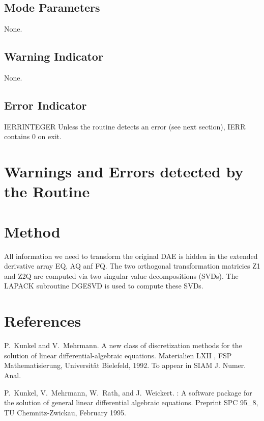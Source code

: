 \subsection{Mode Parameters}
None.

\subsection{Warning Indicator}
None.

\subsection{Error Indicator}

\begin{entry}{IERR}{INTEGER}
  Unless the routine detects an error (see next section), IERR
  contains $0$ on exit.
\end{entry}

\section{Warnings and Errors detected by the Routine}


\section{Method}

All information we need to transform the original DAE is hidden in the
extended derivative array EQ, AQ anf FQ. The two orthogonal transformation
matricies Z1 and Z2Q are computed via two singular value
decompositions (SVDs). The LAPACK subroutine DGESVD is used to compute
these SVDs. 

\section{References}

\begin{thebibliography}{1}
P.~Kunkel and V.~Mehrmann.
\newblock A new class of discretization methods for the solution of linear
  differential-algebraic equations.
\newblock Materialien LXII , FSP Mathematisierung, Universit{\"a}t Bielefeld,
  1992.
\newblock To appear in SIAM J. Numer. Anal.

P.~Kunkel, V.~Mehrmann, W.~Rath, and J.~Weickert.
: A software package for the solution of general linear
  differential algebraic equations.
\newblock Preprint SPC 95\_8, TU Chemnitz-Zwickau, February 1995.

\end{thebibliography}









